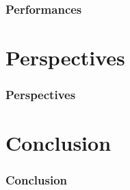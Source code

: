 \documentclass{beamer}
\begin{document}
\begin{frame}
  \frametitle{Performances}
\end{frame}

\section{Perspectives}

\begin{frame}
  \frametitle{Perspectives}
\end{frame}

\section{Conclusion}

\begin{frame}
  \frametitle{Conclusion}
\end{frame}


 
\end{document}
